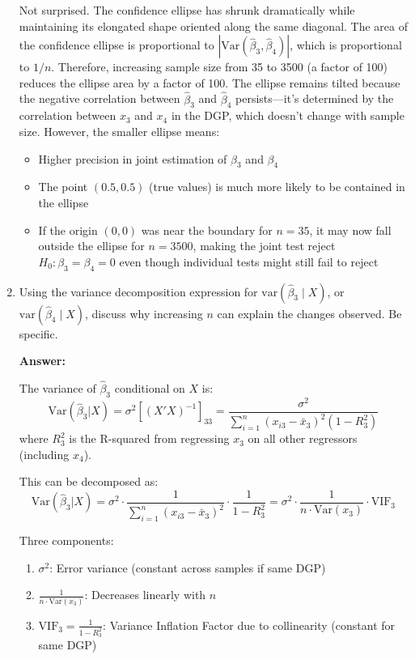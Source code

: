 \documentclass[12pt,a4paper]{article}
\begin{document}
\begin{enumerate}[label=(\roman*)]
  Not surprised. The confidence ellipse has shrunk dramatically while maintaining its elongated shape oriented along the same diagonal.
  The area of the confidence ellipse is proportional to $|\text{Var}(\hat{\beta}_3, \hat{\beta}_4)|$, which is proportional to $1/n$. Therefore, increasing sample size from 35 to 3500 (a factor of 100) reduces the ellipse area by a factor of 100.
  The ellipse remains tilted because the negative correlation between $\hat{\beta}_3$ and $\hat{\beta}_4$ persists—it's determined by the correlation between $x_3$ and $x_4$ in the DGP, which doesn't change with sample size. However, the smaller ellipse means:

  \begin{itemize}
  \item Higher precision in joint estimation of $\beta_3$ and $\beta_4$
  \item The point $(0.5, 0.5)$ (true values) is much more likely to be contained in the ellipse
  \item If the origin $(0,0)$ was near the boundary for $n=35$, it may now fall outside the ellipse for $n=3500$, making the joint test reject $H_0: \beta_3 = \beta_4 = 0$ even though individual tests might still fail to reject
  \end{itemize}

  \item Using the variance decomposition expression for $\text{var}(\hat{\beta}_3 \mid X)$, or $\text{var}(\hat{\beta}_4 \mid X)$, discuss why increasing $n$ can explain the changes observed. Be specific.
  
  \textbf{Answer:} 

  The variance of $\hat{\beta}_3$ conditional on $X$ is:
  $$\text{Var}(\hat{\beta}_3 | X) = \sigma^2 [(X'X)^{-1}]_{33} = \frac{\sigma^2}{\sum_{i=1}^{n}(x_{i3} - \bar{x}_3)^2 (1 - R_3^2)}$$
  where $R_3^2$ is the R-squared from regressing $x_3$ on all other regressors (including $x_4$).

  This can be decomposed as:
  $$\text{Var}(\hat{\beta}_3 | X) = \sigma^2 \cdot \frac{1}{\sum_{i=1}^{n}(x_{i3} - \bar{x}_3)^2} \cdot \frac{1}{1 - R_3^2} = \sigma^2 \cdot \frac{1}{n \cdot \text{Var}(x_3)} \cdot \text{VIF}_3$$

  Three components:
  \begin{enumerate}
    \item $\sigma^2$: Error variance (constant across samples if same DGP)
    \item $\frac{1}{n \cdot \text{Var}(x_3)}$: Decreases linearly with $n$
    \item $\text{VIF}_3 = \frac{1}{1-R_3^2}$: Variance Inflation Factor due to collinearity (constant for same DGP)
  \end{enumerate}


\end{enumerate}
\end{document}
